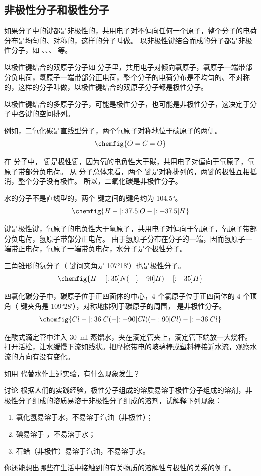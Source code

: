 \subsection{非极性分子和极性分子}
如果分子中的键都是非极性的，共用电子对不偏向任何一个原子，整个分子的电荷分布是均匀的、对称的，这样的分子叫做。
以非极性键结合而成的分子都是非极性分子，如 、、、 等。

以极性键结合的双原子分子如  分子里，共用电子对倾向氯原子，氯原子一端带部分负电荷，氢原子一端带部分正电荷，整个分子的电荷分布是不均匀的、不对称的，这样的分子叫做，以极性键结合的双原子分子都是极性分子。

以极性键结合的多原子分子，可能是极性分子，也可能是非极性分子，这决定于分子中各键的空间排列。

例如，二氧化碳是直线型分子，两个氧原子对称地位于碳原子的两侧。
\[ \chemfig{O=C=O}\]

在  分子中， 键是极性键，因为氧的电负性大于碳，共用电子对偏向于氧原子，氧原子带部分负电荷。
从  分子总体来看，两个  键是对称排列的，两键的极性互相抵消，整个分子没有极性。
所以，二氧化碳是非极性分子。

水的分子不是直线型的，两个  键之间的键角约为 \ang{104.5}。
\[ \chemfig{H-[:37.5]O-[:-37.5]H} \]

 键是极性键，氧原子的电负性大于氢原子，共用电子对偏向于氧原子，氧原子带部分负电荷，氢原子带部分正电荷。
由于氢原子分布在分子的一端，因而氢原子一端带正电荷，氧原子一端带负电荷，水分子是个极性分子。

三角锥形的氨分子（ 键间夹角是 \ang{107;18;}）也是极性分子。
\[ \chemfig{H-[:35]N(-[:-90]H)-[:-35]H}\]


四氯化碳分子中，碳原子位于正四面体的中心，4 个氯原子位于正四面体的 4 个顶角（ 键夹角是 \ang{109;28;}），对称地排列于碳原子的周围， 是非极性分子。
\[ \chemfig{Cl-[:36]C(-[:-90]Cl)(-[:90]Cl)-[:-36]Cl}\]

\begin{Experiment}
  在酸式滴定管中注入 \qty{30}{ml} 蒸馏水，夹在滴定管夹上，滴定管下端放一大烧杯。打开活栓，让水缓慢下流如线状。把摩擦带电的玻璃棒或塑料棒接近水流，观察水流的方向有没有变化。

  如用  代替水作上述实验，有什么现象发生？
\end{Experiment}
\begin{Theorem}{讨论}
根据人们的实践经验，极性分子组成的溶质易溶于极性分子组成的溶剂，非极性分子组成的溶质易溶于非极性分子组成的溶剂，试解释下列现象：
\begin{enumerate}[(1)]
  \item 氯化氢易溶于水，不易溶于汽油（非极性）；
  \item 碘易溶于 ，不易溶于水；
  \item 石蜡（非极性）易溶于汽油，不易溶于水。
\end{enumerate}

你还能想出哪些在生活中接触到的有关物质的溶解性与极性的关系的例子。
\end{Theorem}


